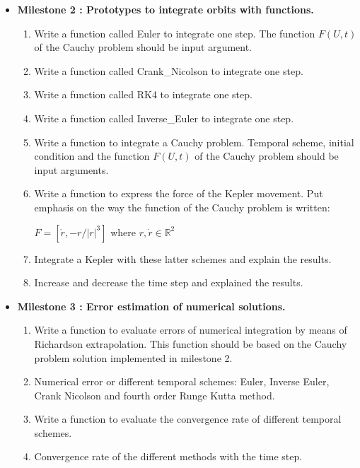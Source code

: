 \documentclass[12pt, a4paper]{article}
\begin{document}
\begin{itemize}

\item {\bf Milestone 2 : Prototypes to integrate orbits with functions. } 

\begin{enumerate} 
\item Write a function called Euler to integrate one step. 
The function  $F(U,t)$ of the Cauchy problem should be input argument.
\item Write a function called Crank\_Nicolson to integrate one step.
\item Write a function called RK4 to integrate one step.
\item Write a function called Inverse\_Euler to integrate one step.
\item Write a function to integrate a Cauchy problem. Temporal scheme, initial condition and 
the function $F(U,t)$ of the Cauchy problem should be input arguments.
\item Write a function to express the force of the Kepler movement.
Put emphasis on the way the function of the Cauchy problem is written: 

$ F = [ \dot r , -r/|r|^3 ] $ where $ r, \dot r \in \mathbb{R}^2 $ 

\item Integrate a Kepler with these latter schemes and explain the results.
\item Increase and decrease the time step and explained the results. 
 
\end{enumerate} 



\item {\bf Milestone 3 : Error estimation of numerical solutions.} 


\begin{enumerate}

\item Write a function to evaluate errors of numerical integration by means of Richardson 
extrapolation. 
This function should be based on the Cauchy problem solution implemented in milestone 2. 
\item Numerical error or different temporal schemes:  
Euler, Inverse Euler, Crank Nicolson 
and  fourth order Runge Kutta method.  
\item Write a function to evaluate the convergence rate of different temporal schemes. 
\item Convergence rate of the different methods with the time step.   


\end{enumerate}
\end{itemize}
\end{document}
